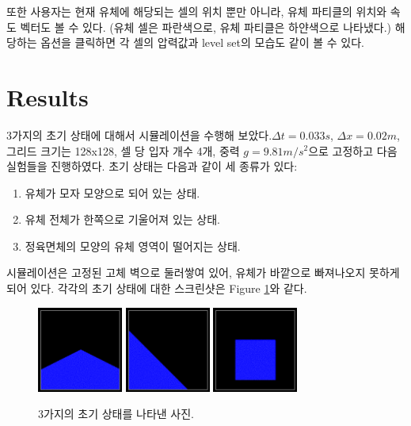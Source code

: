 \documentclass[12pt, A4]{article}
\begin{document}
또한 사용자는 현재 유체에 해당되는 셀의 위치 뿐만 아니라, 유체 파티클의 위치와 속도 벡터도 볼 수 있다. (유체 셀은 파란색으로, 유체 파티클은 하얀색으로 나타냈다.) 해당하는 옵션을 클릭하면 각 셀의 압력값과 level set의 모습도 같이 볼 수 있다.

\section{Results}

3가지의 초기 상태에 대해서 시뮬레이션을 수행해 보았다.$\Delta t = 0.033s$, $\Delta x = 0.02m$, 그리드 크기는 128x128, 셀 당 입자 개수 4개, 중력 $g=9.81m/s^2$으로 고정하고 다음 실험들을 진행하였다. 초기 상태는 다음과 같이 세 종류가 있다:

\begin{enumerate}[label=\Alph*.]
  \item 유체가 모자 모양으로 되어 있는 상태.
  \item 유체 전체가 한쪽으로 기울어져 있는 상태.
  \item 정육면체의 모양의 유체 영역이 떨어지는 상태.
\end{enumerate}

시뮬레이션은 고정된 고체 벽으로 둘러쌓여 있어, 유체가 바깥으로 빠져나오지 못하게 되어 있다. 각각의 초기 상태에 대한 스크린샷은 Figure \ref{fluid-init-state}와 같다.

\begin{figure}[h]
  \centering
\includegraphics[width=0.25\textwidth]{init_state_1}
\includegraphics[width=0.25\textwidth]{init_state_2}
\includegraphics[width=0.25\textwidth]{init_state_3}
  \caption{3가지의 초기 상태를 나타낸 사진.}
  \label{fluid-init-state}
\end{figure}
\end{document}
